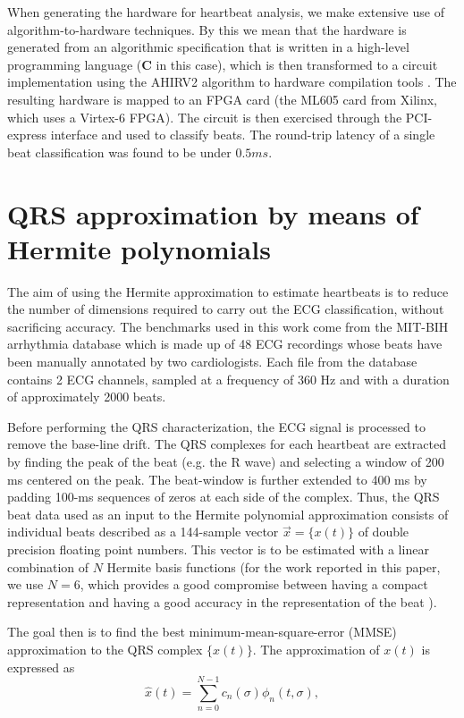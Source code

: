 \documentclass[conference]{IEEEtran}
\begin{document}
When generating the hardware for heartbeat analysis, we make extensive use of
algorithm-to-hardware techniques.  By this we mean that the hardware is
generated from an algorithmic specification that is written in a
high-level programming language ({\bf C} in this case), which is then
transformed to a circuit implementation using the AHIRV2 algorithm to hardware 
compilation tools \cite{c:ahir_thesis2009,c:ahir_dsd2010,c:ahir_usenix2012}.
The resulting hardware is %
 mapped to an FPGA card (the ML605 card from Xilinx,
which uses a Virtex-6 FPGA).  The circuit is then exercised through the PCI-express 
interface and used to classify beats.  The round-trip latency of a single
beat classification was found to be under $0.5ms$.


\section{QRS approximation by means of Hermite polynomials}\label{s:arr}

The aim of using the Hermite approximation to estimate heartbeats is to 
reduce the number of dimensions required to carry out the ECG classification, 
without sacrificing accuracy. 
The benchmarks used in this work come from the MIT-BIH arrhythmia database \cite{j:moody01} which is made up of 
48 ECG recordings whose beats  have been manually annotated by two cardiologists. 
Each file from the database 
contains 2 ECG channels, sampled at a frequency of 360 Hz and with a duration of approximately 2000 beats. 

Before performing the QRS characterization, the ECG signal is processed to remove
the base-line drift.  The QRS complexes for each heartbeat are extracted by 
finding the peak of the beat (e.g. the R wave) and selecting a  window of 200 ms centered on the peak. 
The beat-window is further extended to 400 ms by padding 100-ms sequences of zeros at each side of the complex. 
Thus, the QRS beat data used as an input to the Hermite polynomial approximation
consists of individual beats described as a 144-sample vector $\vec{x}=\{x(t)\}$ of double
precision floating point numbers. 
This vector is to be estimated with a linear combination of $N$ Hermite basis functions (for
the work reported in this paper, we use $N=6$, which provides a good compromise between having a compact representation and having a good accuracy in the representation of the beat \cite{c:marquez13}).

The goal then is to find the best minimum-mean-square-error (MMSE) approximation to the QRS complex $\{ x(t)\}$. The approximation of $x(t)$ is expressed as
\begin{equation}\label{eqn:hat}
\hat{x}(t)=\sum_{n=0}^{N-1}c_n(\sigma )\phi_n(t,\sigma),
\end{equation}
\end{document}
